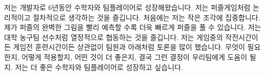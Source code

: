 

\begin{cvparagraph}

저는 개발자로 6년동안 수학자와 팀플레이어로 성장해왔습니다.
저는 퍼즐게임처럼 논리적이고 절차적으로 생각하는 것을 즐깁니다.
처음에는 저는 작은 조각에 집중합니다.
제가 퍼즐의 완벽한 그림을 빨리 예측할 수록 더욱 빠르게 퍼즐을 풀 수 있습니다.
저는 대학 농구팀 선수처럼 열정적으로 협동하는 것을 즐깁니다.
저는 게임중의 작전시간이든 게임전 훈련시간이든 상관없이 팀원과 아래처럼 토론을 많이 했습니다.
무엇이 필요한지, 어떻게 적용할지, 어떤 것이 더 좋은지, 결국 그런 결정이 우리팀에게 도움이 될지.
저는 더 좋은 수학자와 팀플레이어로 성장하고 싶습니다.
\end{cvparagraph}
